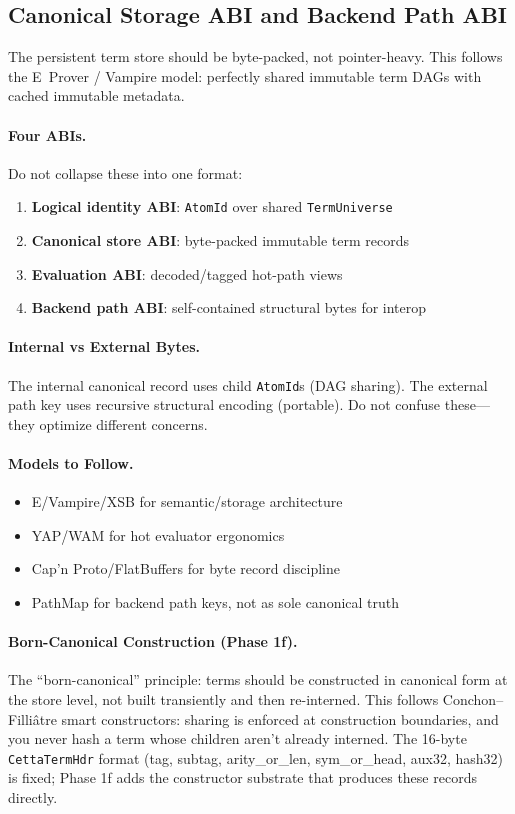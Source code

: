 \documentclass[11pt]{article}
\newcommand{\code}[1]{\texttt{#1}}
\newcommand{\PathMap}{\textup{PathMap}}
\newcommand{\WAM}{\textup{WAM}}
\newcommand{\XSB}{\textup{XSB}}
\begin{document}
\subsection{Canonical Storage ABI and Backend Path ABI}
\label{sec:storage-abi}

The persistent term store should be byte-packed, not pointer-heavy.  This
follows the E~Prover / Vampire model: perfectly shared immutable term DAGs
with cached immutable metadata.

\paragraph{Four ABIs.}
Do not collapse these into one format:
\begin{enumerate}
\item \textbf{Logical identity ABI}: \code{AtomId} over shared \code{TermUniverse}
\item \textbf{Canonical store ABI}: byte-packed immutable term records
\item \textbf{Evaluation ABI}: decoded/tagged hot-path views
\item \textbf{Backend path ABI}: self-contained structural bytes for interop
\end{enumerate}

\paragraph{Internal vs External Bytes.}
The internal canonical record uses child \code{AtomId}s (DAG sharing).
The external path key uses recursive structural encoding (portable).
Do not confuse these---they optimize different concerns.

\paragraph{Models to Follow.}
\begin{itemize}
\item E/Vampire/\XSB{} for semantic/storage architecture
\item YAP/\WAM{} for hot evaluator ergonomics
\item Cap'n Proto/FlatBuffers for byte record discipline
\item \PathMap{} for backend path keys, not as sole canonical truth
\end{itemize}

\paragraph{Born-Canonical Construction (Phase 1f).}
The ``born-canonical'' principle: terms should be constructed in canonical
form at the store level, not built transiently and then re-interned.  This
follows Conchon--Filli\^{a}tre smart constructors: sharing is enforced at
construction boundaries, and you never hash a term whose children aren't
already interned.  The 16-byte \code{CettaTermHdr} format (tag, subtag,
arity\_or\_len, sym\_or\_head, aux32, hash32) is fixed; Phase 1f adds the
constructor substrate that produces these records directly.
\end{document}
